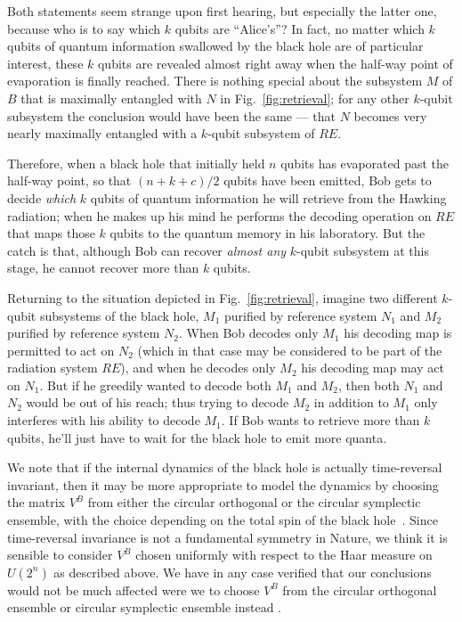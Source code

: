 \documentclass[11pt]{article}
\begin{document}
Both statements seem strange upon first hearing, but especially the latter one, because who is to say which $k$ qubits are ``Alice's''? In fact, no matter which $k$ qubits of quantum information swallowed by the black hole are of particular interest, these $k$ qubits are revealed almost right away when the half-way point of evaporation is finally reached. There is nothing special about the subsystem $M$ of $B$ that is maximally entangled with $N$ in Fig.~\ref{fig:retrieval}; for any other $k$-qubit subsystem the conclusion would have been the same --- that $N$ becomes very nearly maximally entangled with a $k$-qubit subsystem of $RE$. 

Therefore, when a black hole that initially held $n$ qubits has evaporated past the half-way point, so that $(n+k+c)/2$ qubits have been emitted, Bob gets to decide {\em which} $k$ qubits of quantum information he will retrieve from the Hawking radiation;  when he makes up his mind he performs the decoding operation on $RE$ that maps those $k$ qubits to the quantum memory in his laboratory. But the catch is that, although Bob can recover {\em almost any} $k$-qubit subsystem at this stage, he cannot recover more than $k$ qubits. 

Returning to the situation depicted in Fig.~\ref{fig:retrieval}, imagine two different $k$-qubit subsystems of the black hole, $M_1$ purified by reference system $N_1$ and $M_2$ purified by reference system $N_2$. When Bob decodes only $M_1$ his decoding map is permitted to act on $N_2$ (which in that case may be considered to be part of the radiation system $RE$), and when he decodes only $M_2$ his decoding map may act on $N_1$. But if he greedily wanted to decode both $M_1$ and $M_2$, then both $N_1$ and $N_2$ would be out of his reach; thus trying to decode $M_2$ in addition to $M_1$ only interferes with his ability to decode $M_1$. If Bob wants to retrieve more than $k$ qubits, he'll just have to wait for the black hole to emit more quanta.

We note that if the internal dynamics of the black hole is actually
time-reversal invariant, then it may be more appropriate to model the
dynamics by choosing the matrix $V^B$ from either the circular orthogonal
or the circular symplectic ensemble, with the choice depending on the
total spin of the black hole~\cite{mehta}.  Since time-reversal invariance
is not a fundamental symmetry in Nature, we think it is sensible to
consider $V^B$ chosen uniformly with respect to the Haar measure on
$U(2^n)$ as described above. We have in any case verified that our
conclusions would not be much affected were we to choose $V^B$ from the
circular orthogonal ensemble or circular symplectic ensemble instead \cite{anderson}.
\end{document}

